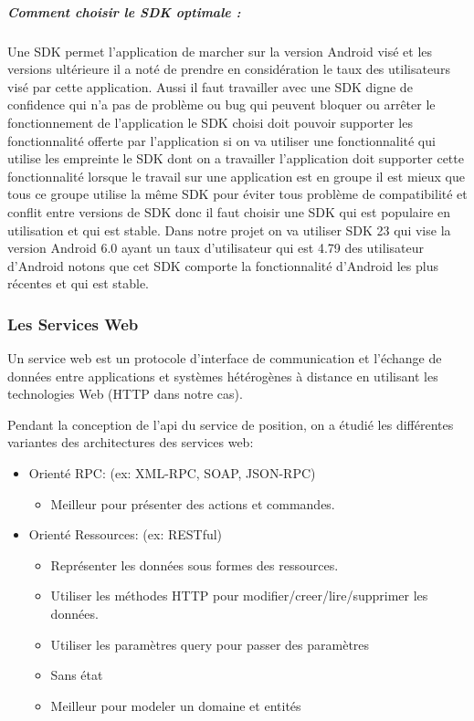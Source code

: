 
\clearpage

\subparagraph{Comment choisir le SDK optimale :}

Une SDK permet l'application de marcher sur la version Android visé
et les versions ultérieure il a noté de prendre en considération le taux des
utilisateurs visé par cette application. Aussi il faut travailler avec une SDK
digne de confidence qui n'a pas de problème ou bug qui peuvent bloquer ou arrêter
le fonctionnement de l'application le SDK choisi doit pouvoir supporter les
fonctionnalité offerte par l'application si on va utiliser une fonctionnalité
qui utilise les empreinte le SDK dont on a travailler l'application doit supporter
cette fonctionnalité lorsque le travail sur une application est en groupe il est
mieux que tous ce groupe utilise la même SDK pour éviter tous problème de
compatibilité et conflit entre versions de SDK donc il faut choisir une SDK
qui est populaire en utilisation et qui est stable. Dans notre projet on va
utiliser SDK 23 qui vise la version Android 6.0 ayant un taux d'utilisateur
qui est 4.79 %
des utilisateur d'Android notons que cet SDK comporte
la fonctionnalité d'Android les plus récentes et qui est stable.

\subsubsection{Les Services Web}

Un service web est un protocole d'interface de communication et l'échange de
données entre applications et systèmes hétérogènes à distance en utilisant les
technologies Web (HTTP dans notre cas).

Pendant la conception de l'api du service de position, on a étudié les
différentes variantes des architectures des services web:
\begin{itemize}
    \item Orienté RPC: (ex: XML-RPC, SOAP, JSON-RPC)
        \begin{itemize}
            \item Meilleur pour présenter des actions et commandes.
        \end{itemize}
    \item Orienté Ressources: (ex: RESTful)
        \begin{itemize}
            \item Représenter les données sous formes des ressources.
            \item Utiliser les méthodes HTTP pour modifier/creer/lire/supprimer les données.
            \item Utiliser les paramètres query pour passer des paramètres
            \item Sans état
            \item Meilleur pour modeler un domaine et entités
        \end{itemize}
\end{itemize}

